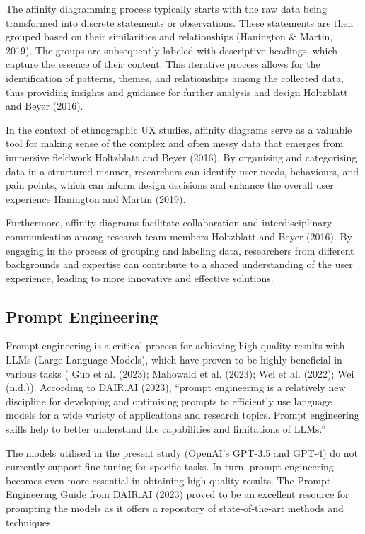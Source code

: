 \documentclass[
]{book}
\begin{document}
The affinity diagramming process typically starts with the raw data being transformed into discrete statements or observations. These statements are then grouped based on their similarities and relationships (Hanington \& Martin, 2019). The groups are subsequently labeled with descriptive headings, which capture the essence of their content. This iterative process allows for the identification of patterns, themes, and relationships among the collected data, thus providing insights and guidance for further analysis and design Holtzblatt and Beyer (2016).

In the context of ethnographic UX studies, affinity diagrams serve as a valuable tool for making sense of the complex and often messy data that emerges from immersive fieldwork Holtzblatt and Beyer (2016). By organising and categorising data in a structured manner, researchers can identify user needs, behaviours, and pain points, which can inform design decisions and enhance the overall user experience Hanington and Martin (2019).

Furthermore, affinity diagrams facilitate collaboration and interdisciplinary communication among research team members Holtzblatt and Beyer (2016). By engaging in the process of grouping and labeling data, researchers from different backgrounds and expertise can contribute to a shared understanding of the user experience, leading to more innovative and effective solutions.

\hypertarget{prompt-engineering}{%
\subsection{Prompt Engineering}\label{prompt-engineering}}

Prompt engineering is a critical process for achieving high-quality results with LLMs (Large Language Models), which have proven to be highly beneficial in various tasks ( Guo et al. (2023); Mahowald et al. (2023); Wei et al. (2022); Wei (n.d.)). According to DAIR.AI (2023), ``prompt engineering is a relatively new discipline for developing and optimising prompts to efficiently use language models for a wide variety of applications and research topics. Prompt engineering skills help to better understand the capabilities and limitations of LLMs.''

The models utilised in the present study (OpenAI's GPT-3.5 and GPT-4) do not currently support fine-tuning for specific tasks. In turn, prompt engineering becomes even more essential in obtaining high-quality results. The Prompt Engineering Guide from DAIR.AI (2023) proved to be an excellent resource for prompting the models as it offers a repository of state-of-the-art methods and techniques.
\end{document}
